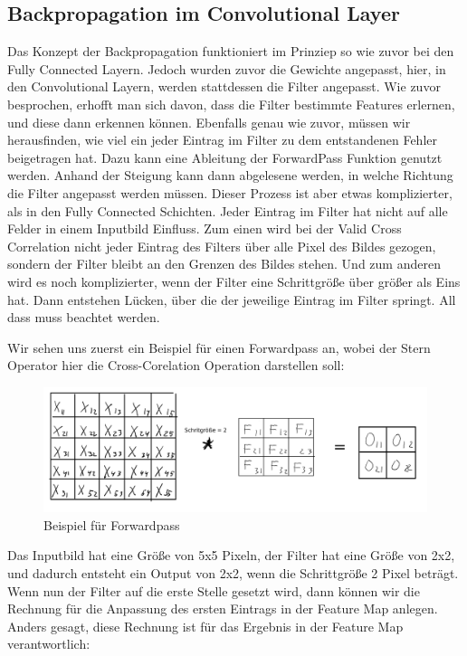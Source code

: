 \documentclass[12pt]{article}
\begin{document}
\subsection{Backpropagation im Convolutional Layer}
Das Konzept der Backpropagation funktioniert im Prinziep so wie zuvor bei den Fully Connected Layern. Jedoch wurden zuvor die Gewichte angepasst, hier, in den Convolutional Layern, werden stattdessen die Filter angepasst. Wie zuvor besprochen, erhofft man sich davon, dass die Filter bestimmte Features erlernen, und diese dann erkennen können.
Ebenfalls genau wie zuvor, müssen wir herausfinden, wie viel ein jeder Eintrag im Filter zu dem entstandenen Fehler beigetragen hat. Dazu kann eine Ableitung der ForwardPass Funktion genutzt werden. Anhand der Steigung kann dann abgelesene werden, in welche Richtung die Filter angepasst werden müssen. Dieser Prozess ist aber etwas komplizierter, als in den Fully Connected Schichten. Jeder Eintrag im Filter hat nicht auf alle Felder in einem Inputbild Einfluss. Zum einen wird bei der Valid Cross Correlation nicht jeder Eintrag des Filters über alle Pixel des Bildes gezogen, sondern der Filter bleibt an den Grenzen des Bildes stehen. Und zum anderen wird es noch komplizierter, wenn der Filter eine Schrittgröße über größer als Eins hat. Dann entstehen Lücken, über die der jeweilige Eintrag im Filter springt. All dass muss beachtet werden. 

Wir sehen uns zuerst ein Beispiel für einen Forwardpass an, wobei der Stern Operator hier die Cross-Corelation Operation darstellen soll:
\begin{figure}[H]
\centering
\includegraphics[scale=0.27]{Images/010_ForwardPassConvolution.png}
\caption{Beispiel für Forwardpass}
\label{Beispiel für Forwardpass}
\end{figure}

Das Inputbild hat eine Größe von 5x5 Pixeln, der Filter hat eine Größe von 2x2, und dadurch entsteht ein Output von 2x2, wenn die Schrittgröße 2 Pixel beträgt. 
Wenn nun der Filter auf die erste Stelle gesetzt wird, dann können wir die Rechnung für die Anpassung des ersten Eintrags in der Feature Map anlegen. Anders gesagt, diese Rechnung ist für das Ergebnis in der Feature Map verantwortlich:
\end{document}
